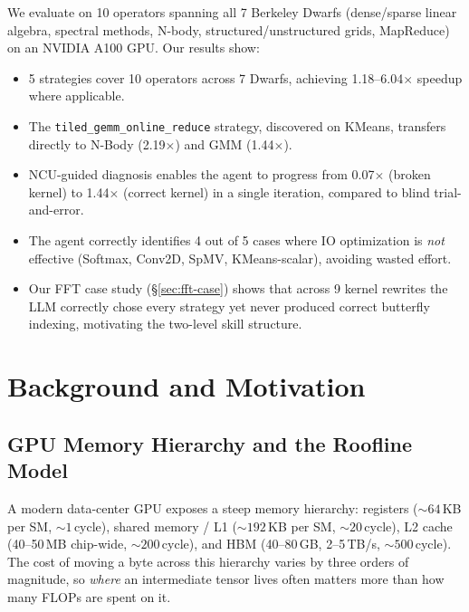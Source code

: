 \documentclass[sigconf,nonacm]{acmart}
\begin{document}
We evaluate on 10 operators spanning all 7 Berkeley Dwarfs (dense/sparse linear algebra, spectral methods, N-body, structured/unstructured grids, MapReduce) on an NVIDIA A100 GPU. Our results show:

\begin{itemize}
    \item 5 strategies cover 10 operators across 7 Dwarfs, achieving 1.18--6.04$\times$ speedup where applicable.
    \item The \texttt{tiled\_gemm\_online\_reduce} strategy, discovered on KMeans, transfers directly to N-Body (2.19$\times$) and GMM (1.44$\times$).
    \item NCU-guided diagnosis enables the agent to progress from 0.07$\times$ (broken kernel) to 1.44$\times$ (correct kernel) in a single iteration, compared to blind trial-and-error.
    \item The agent correctly identifies 4 out of 5 cases where IO optimization is \emph{not} effective (Softmax, Conv2D, SpMV, KMeans-scalar), avoiding wasted effort.
    \item Our FFT case study (\S\ref{sec:fft-case}) shows that across
    9 kernel rewrites the LLM correctly chose every strategy yet
    never produced correct butterfly indexing, motivating the
    two-level skill structure.
\end{itemize}

\section{Background and Motivation}

\subsection{GPU Memory Hierarchy and the Roofline Model}
\label{sec:bg-roofline}

A modern data-center GPU exposes a steep memory hierarchy: registers
($\sim\!64\,$KB per SM, $\sim\!1\,$cycle), shared memory / L1
($\sim\!192\,$KB per SM, $\sim\!20\,$cycle), L2 cache (40--50\,MB
chip-wide, $\sim\!200\,$cycle), and HBM
(40--80\,GB, 2--5\,TB/s, $\sim\!500\,$cycle). The cost of moving a
byte across this hierarchy varies by three orders of magnitude, so
\emph{where} an intermediate tensor lives often matters more than how
many FLOPs are spent on it.
\end{document}
